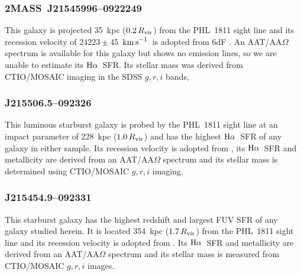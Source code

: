 \documentclass[twocolumn,twocolappendix,tighten,times]{aastex6}
\newcommand{\Ha}{\ensuremath{{\rm H}\alpha}}
\newcommand{\kms}{\ensuremath{{\rm km\,s}^{-1}}}
\begin{document}
\subsubsection{2MASS~J21545996--0922249}
\label{indiv:galaxies:2massj2154-09}

This galaxy is projected 35~kpc ($0.2\,R_{\rm vir}$) from the PHL~1811 sight 
line and its recession velocity of $24223\pm45$~\kms\ is adopted from 6dF 
\citep{jones05}. An AAT/AA$\Omega$ spectrum is available for this galaxy but 
shows no emission lines, so we are unable to estimate its \Ha\ SFR. Its stellar 
mass was derived from CTIO/MOSAIC imaging in the SDSS $g,r,i$ bands,



\subsubsection{J215506.5--092326}
\label{indiv:galaxies:j2155-09}

This luminous starburst galaxy is probed by the PHL~1811 sight line at an impact 
parameter of 228~kpc ($1.0\,R_{\rm vir}$) and has the highest \Ha\ SFR of any 
galaxy in either sample. Its recession velocity is adopted from 
\citet{prochaska11b}, its \Ha\ SFR and metallicity are derived from an 
AAT/AA$\Omega$ spectrum and its stellar mass is determined using CTIO/MOSAIC 
$g,r,i$ imaging.


\subsubsection{J215454.9--092331}
\label{indiv:galaxies:j2154-09c}

This starburst galaxy has the highest redshift and largest FUV SFR of any galaxy 
studied herein. It is located 354~kpc ($1.7\,R_{\rm vir}$) from the PHL~1811 sight 
line and its recession velocity is adopted from \citet{prochaska11b}. Its \Ha\ 
SFR and metallicity are derived from an AAT/AA$\Omega$ spectrum and its stellar 
mass is measured from CTIO/MOSAIC $g,r,i$ images.

\end{document}
